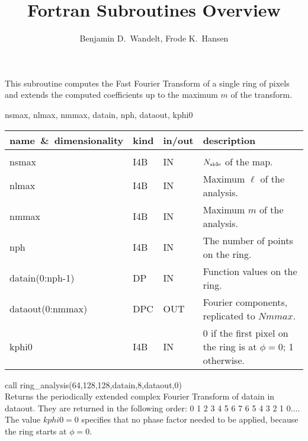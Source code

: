 
\sloppy


\title{\healpix Fortran Subroutines Overview}
 \section[ring\_analysis]{ }
\label{sub:ring_analysis}
\author{Benjamin D.~Wandelt, Frode K.~Hansen}

\begin{facility}
{This subroutine computes the Fast Fourier Transform of a single ring
 of pixels
 and extends the computed coefficients up to the maximum
 $m$ of the transform.}
{\modAlmTools}
\end{facility}

\begin{f90format}
{nsmax, nlmax, nmmax, datain, nph, dataout, kphi0}
\end{f90format}

\begin{arguments}
{
\begin{tabular}{p{0.4\hsize} p{0.05\hsize} p{0.1\hsize} p{0.35\hsize}} \hline  
\textbf{name~\&~dimensionality} & \textbf{kind} & \textbf{in/out} & \textbf{description} \\ \hline
                   &   &   &                           \\ %
nsmax & I4B & IN & ${N_{\rm side}}$ of the map. \\
nlmax & I4B & IN & Maximum $\ell$ of the analysis.\\
nmmax & I4B & IN & Maximum $m$ of the analysis.\\
nph & I4B & IN & The number of points on the ring. \\ 
datain(0:nph-1) & DP & IN & Function values on the ring. \\
dataout(0:nmmax) & DPC & OUT & Fourier components, replicated to $Nmmax$.\\
kphi0 & I4B & IN & 0 if the first pixel on the ring is  at
                   $\phi=0$; 1 otherwise. \\
\end{tabular}
}
\end{arguments}

\begin{example}
{
call ring\_analysis(64,128,128,datain,8,dataout,0)  \\
}
{
Returns the periodically extended complex 
Fourier Transform of datain in
dataout. They are returned in the following order: 0 1 2 3 4 5 6 7
6 5 4 3 2 1 $0\dots$. The value $kphi0=0$ specifies that no phase
factor needed to be applied, because the ring starts at $\phi=0$.
}
\end{example}

